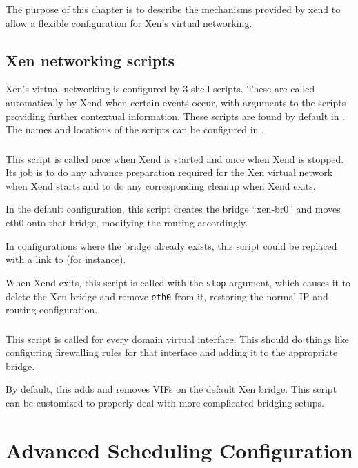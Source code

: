 \documentclass[11pt,twoside,final,openright]{xenstyle}
\begin{document}
The purpose of this chapter is to describe the mechanisms provided by
xend to allow a flexible configuration for Xen's virtual networking.

\section{Xen networking scripts}

Xen's virtual networking is configured by 3 shell scripts.  These are
called automatically by Xend when certain events occur, with arguments
to the scripts providing further contextual information.  These
scripts are found by default in .  The names and
locations of the scripts can be configured in .

\subsection{}

This script is called once when Xend is started and once when Xend is
stopped.  Its job is to do any advance preparation required for the
Xen virtual network when Xend starts and to do any corresponding
cleanup when Xend exits.

In the default configuration, this script creates the bridge
``xen-br0'' and moves eth0 onto that bridge, modifying the routing
accordingly.

In configurations where the bridge already exists, this script could
be replaced with a link to  (for instance).

When Xend exits, this script is called with the {\tt stop} argument,
which causes it to delete the Xen bridge and remove {\tt eth0} from
it, restoring the normal IP and routing configuration.

\subsection{}

This script is called for every domain virtual interface.  This should
do things like configuring firewalling rules for that interface and
adding it to the appropriate bridge.

By default, this adds and removes VIFs on the default Xen bridge.
This script can be customized to properly deal with more complicated
bridging setups.

\chapter{Advanced Scheduling Configuration}
\end{document}
